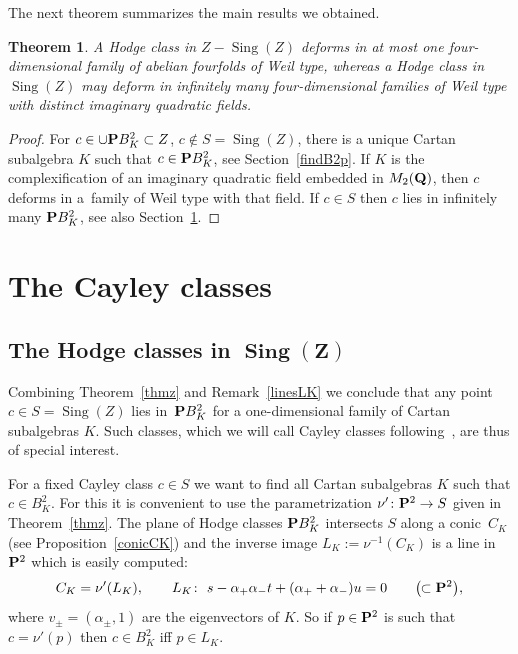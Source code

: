 \documentclass[pdftex]{sigma}
\numberwithin{equation}{section}
\newtheorem{Theorem}{Theorem}[section]
\begin{document}
The next theorem summarizes the main results we obtained.

\begin{Theorem} \label{thmsum}
A Hodge class in $Z-\operatorname{Sing}(Z)$ deforms in at most one four-dimensional family
of abelian fourfolds of Weil type, whereas a Hodge class in~$\operatorname{Sing}(Z)$ may deform in infinitely many
four-dimensional families of Weil type with distinct imaginary quadratic fields.
\end{Theorem}

\begin{proof}
For $c\in \cup {\bf P} B^2_K\subset Z$, $c\not\in S=\operatorname{Sing}(Z)$, there is a unique Cartan subalgebra $K$
such that $c\in{\bf P} B^2_K$, see Section~\ref{findB2p}. If $K$ is the complexification of an imaginary quadratic
field embedded in $M_2({\bf Q})$, then $c$ deforms in a~family of Weil type with that field.
If $c\in S$ then $c$ lies in infinitely many ${\bf P} B^2_K$, see also Section~\ref{cayleyclasses}.
\end{proof}

\section{The Cayley classes}\label{cayleyclasses}

\subsection[The Hodge classes in Sing(Z)]{The Hodge classes in $\boldsymbol{\operatorname{Sing}(Z)}$}

Combining Theorem~\ref{thmz} and Remark~\ref{linesLK} we conclude that any point
$c\in S=\operatorname{Sing}(Z)$ lies in~${\bf P} B^2_K$ for a one-dimensional family of
Cartan subalgebras $K$. Such classes, which we will call Cayley classes following~\cite{Markman},
are thus of special interest.

For a fixed Cayley class $c\in S$ we want to find all Cartan subalgebras $K$ such that $c\in B^2_K$.
For this it is convenient to use the parametrization $\nu'\colon {\bf P}^2\rightarrow S$ given in Theorem~\ref{thmz}. The plane of Hodge classes ${\bf P} B^2_K$ intersects $S$ along a conic~$C_K$
(see Proposition~\ref{conicCK})
and the inverse image $L_K:=\nu^{-1}(C_K)$ is a line in ${\bf P}^2$ which is easily computed:
\[
C_K = \nu'(L_K),\qquad L_K\colon \ s - \alpha_+\alpha_- t + (\alpha_+ + \alpha_-)u = 0
\qquad\big(\!\!\subset {\bf P}^2\big),
\]
where $v_\pm=(\alpha_\pm,1)$ are the eigenvectors of $K$. So if $p\in{\bf P}^2$ is such that
$c=\nu'(p)$ then $c\in B^2_K$ iff $p\in L_K$.
\end{document}
